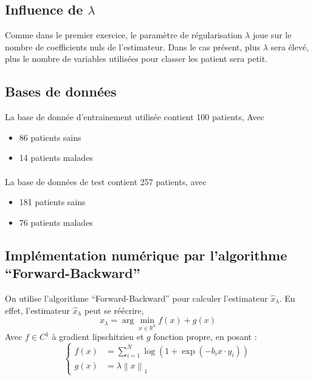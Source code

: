 \documentclass{article}
\newcommand{\Rset}{\mathbb{R}}
\newcommand{\xhat}{{\hat{x}}}
\newcommand{\norm}[2][2]{\left\lVert#2\right\rVert_{#1}}
\begin{document}
\subsection{Influence de $\lambda$}

Comme dans le premier exercice, le paramètre de régularisation $\lambda$ joue sur le nombre de coefficients nuls de l'estimateur. Dans le cas présent, plus $\lambda$ sera élevé, plus le nombre de variables utilisées pour classer les patient sera petit.

\subsection{Bases de données}
La base de donnée d'entrainement utilisée contient 100 patients, Avec
\begin{itemize}
  \item 86 patients sains
  \item 14 patients malades
\end{itemize}

\paragraph{}La base de données de test contient 257 patients, avec
\begin{itemize}
  \item 181 patients sains
  \item 76 patients malades
\end{itemize}

\subsection{Implémentation numérique par l'algorithme ``Forward-Backward''}
On utilise l'algorithme ``Forward-Backward'' pour calculer l'estimateur $\xhat_\lambda$. En effet, l'estimateur $\xhat_\lambda$ peut se réécrire,
\[
\xhat_\lambda = \arg\min_{x \in \Rset^k} f(x) + g(x)
\]
Avec $f \in C^1$ à gradient lipschitzien  et $g$ fonction propre, en posant :
\[
\left\{\begin{aligned}
  f(x) &= \sum_{i = 1}^N  \log \left( 1 + \exp(-b_i x\cdot y_i) \right)\\
  g(x) &= \lambda \norm[1]{x}
\end{aligned}
\right.
\]
\end{document}
